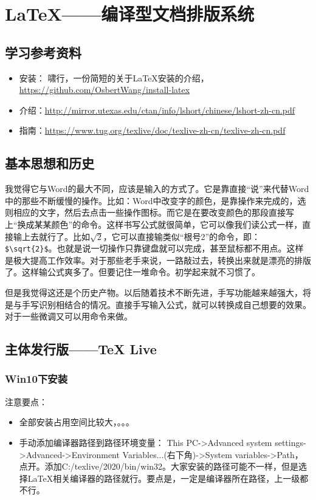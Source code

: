 \chapter{\LaTeX{}——编译型文档排版系统}
\section{学习参考资料}
\begin{itemize}
\item 安装： 啸行，一份简短的关于\LaTeX{}安装的介绍，\url{https://github.com/OsbertWang/install-latex}
\item 介绍：\url{http://mirror.utexas.edu/ctan/info/lshort/chinese/lshort-zh-cn.pdf}
\item 指南：\url{https://www.tug.org/texlive/doc/texlive-zh-cn/texlive-zh-cn.pdf}
\end{itemize}


\section{基本思想和历史}
我觉得它与Word的最大不同，应该是输入的方式了。它是靠直接“说”来代替Word中的那些不断缓慢的操作。比如：Word中改变字的颜色，是靠操作来完成的，选则相应的文字，然后去点击一些操作图标。而它是在要改变颜色的那段直接写上“换成某某颜色”的命令。这样书写公式就很简单，它可以像我们读公式一样，直接输上去就行了。比如$\sqrt{2}$，它可以直接输类似“根号2”的命令，即：\verb|$\sqrt{2}$|。也就是说一切操作只靠键盘就可以完成，甚至鼠标都不用点。这样是极大提高工作效率。对于那些老手来说，一路敲过去，转换出来就是漂亮的排版了。这样输公式爽多了。但要记住一堆命令。初学起来就不习惯了。

但是我觉得这还是个历史产物。以后随着技术不断先进，手写功能越来越强大，将是与手写识别相结合的情况。直接手写输入公式，就可以转换成自己想要的效果。对于一些微调又可以用命令来做。




\section{主体发行版——\TeX{} Live }
\subsection{Win10下安装}
注意要点：
\begin{itemize}
\item 全部安装占用空间比较大，。。。
\item 手动添加编译器路径到路径环境变量：
This PC->Advanced system settings->Advanced->Environment Variables...(右下角)->System variables->Path，点开。添加C:/texlive/2020/bin/win32。大家安装的路径可能不一样，但是选择\LaTeX{}相关编译器的路径就行。要点是，一定是编译器所在路径，上一级都不行。
\end{itemize}



